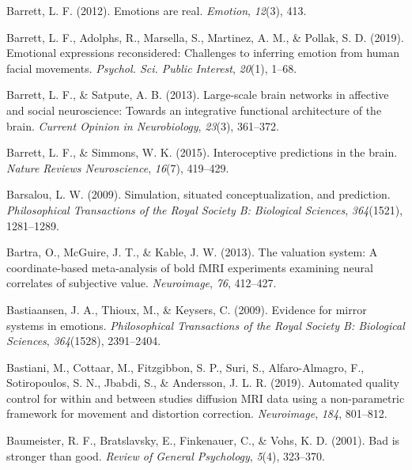 \documentclass[11pt,american,]{memoir} %
\begin{document}
\leavevmode\hypertarget{ref-barrett2012emotions}{}%
Barrett, L. F. (2012). Emotions are real. \emph{Emotion}, \emph{12}(3), 413.

\leavevmode\hypertarget{ref-Barrett2019-bc}{}%
Barrett, L. F., Adolphs, R., Marsella, S., Martinez, A. M., \& Pollak, S. D. (2019). Emotional expressions reconsidered: Challenges to inferring emotion from human facial movements. \emph{Psychol. Sci. Public Interest}, \emph{20}(1), 1--68.

\leavevmode\hypertarget{ref-barrett2013large}{}%
Barrett, L. F., \& Satpute, A. B. (2013). Large-scale brain networks in affective and social neuroscience: Towards an integrative functional architecture of the brain. \emph{Current Opinion in Neurobiology}, \emph{23}(3), 361--372.

\leavevmode\hypertarget{ref-barrett2015interoceptive}{}%
Barrett, L. F., \& Simmons, W. K. (2015). Interoceptive predictions in the brain. \emph{Nature Reviews Neuroscience}, \emph{16}(7), 419--429.

\leavevmode\hypertarget{ref-barsalou2009simulation}{}%
Barsalou, L. W. (2009). Simulation, situated conceptualization, and prediction. \emph{Philosophical Transactions of the Royal Society B: Biological Sciences}, \emph{364}(1521), 1281--1289.

\leavevmode\hypertarget{ref-bartra2013valuation}{}%
Bartra, O., McGuire, J. T., \& Kable, J. W. (2013). The valuation system: A coordinate-based meta-analysis of bold fMRI experiments examining neural correlates of subjective value. \emph{Neuroimage}, \emph{76}, 412--427.

\leavevmode\hypertarget{ref-bastiaansen2009evidence}{}%
Bastiaansen, J. A., Thioux, M., \& Keysers, C. (2009). Evidence for mirror systems in emotions. \emph{Philosophical Transactions of the Royal Society B: Biological Sciences}, \emph{364}(1528), 2391--2404.

\leavevmode\hypertarget{ref-Bastiani2019-sm}{}%
Bastiani, M., Cottaar, M., Fitzgibbon, S. P., Suri, S., Alfaro-Almagro, F., Sotiropoulos, S. N., Jbabdi, S., \& Andersson, J. L. R. (2019). Automated quality control for within and between studies diffusion MRI data using a non-parametric framework for movement and distortion correction. \emph{Neuroimage}, \emph{184}, 801--812.

\leavevmode\hypertarget{ref-baumeister2001bad}{}%
Baumeister, R. F., Bratslavsky, E., Finkenauer, C., \& Vohs, K. D. (2001). Bad is stronger than good. \emph{Review of General Psychology}, \emph{5}(4), 323--370.
\end{document}
